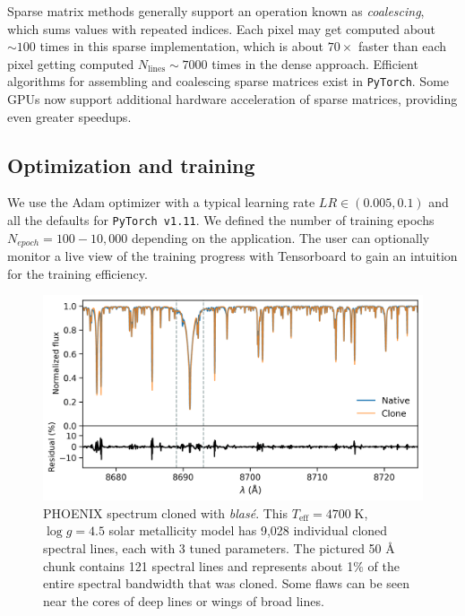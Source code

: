 \documentclass[twocolumn]{aastex631}
\begin{document}
Sparse matrix methods generally support an operation known as \emph{coalescing}, which sums values with repeated indices. Each pixel may get computed about $\sim100$ times in this sparse implementation, which is about $70\times$ faster than each pixel getting computed $N_\mathrm{lines}\sim7000$ times in the dense approach.  Efficient algorithms for assembling and coalescing sparse matrices exist in \texttt{PyTorch}.  Some GPUs now support additional hardware acceleration of sparse matrices, providing even greater speedups.



\subsection{Optimization and training}

We use the Adam optimizer \citep{2014arXiv1412.6980K} with a typical learning rate $LR\in (0.005, 0.1)$ and all the defaults for \texttt{PyTorch v1.11}.  We defined the number of training epochs $N_{epoch}=100-10,000$ depending on the application. The user can optionally monitor a live view of the training progress with Tensorboard \citep{tensorflow2015-whitepaper} to gain an intuition for the training efficiency.


\begin{figure}[hbt!]
    \centering
    \includegraphics[width=1.0\columnwidth]{blase_clone_demo.png}
    \caption{PHOENIX spectrum cloned with \emph{blas\'e}.  This $T_{\mathrm{eff}}=4700\;$K,  $\log{g}=4.5$ solar metallicity model has 9,028 individual cloned spectral lines, each with 3 tuned parameters.  The pictured 50 \AA~ chunk contains 121 spectral lines and represents about 1$\%$ of the entire spectral bandwidth that was cloned.  Some flaws can be seen near the cores of deep lines or wings of broad lines.}
    \label{fig_cloned_spectrum_demo}
\end{figure}
\end{document}
